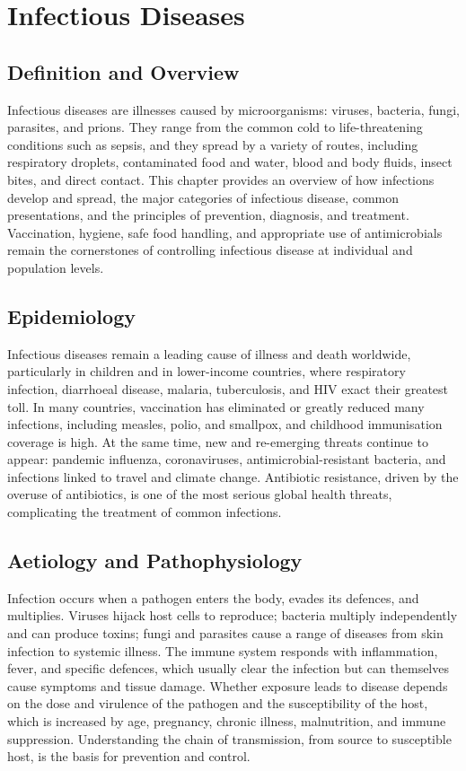 \chapter{Infectious Diseases}

\section*{Definition and Overview}
Infectious diseases are illnesses caused by microorganisms: viruses, bacteria, fungi, parasites, and prions. They range from the common cold to life-threatening conditions such as sepsis, and they spread by a variety of routes, including respiratory droplets, contaminated food and water, blood and body fluids, insect bites, and direct contact. This chapter provides an overview of how infections develop and spread, the major categories of infectious disease, common presentations, and the principles of prevention, diagnosis, and treatment. Vaccination, hygiene, safe food handling, and appropriate use of antimicrobials remain the cornerstones of controlling infectious disease at individual and population levels.

\section*{Epidemiology}
Infectious diseases remain a leading cause of illness and death worldwide, particularly in children and in lower-income countries, where respiratory infection, diarrhoeal disease, malaria, tuberculosis, and HIV exact their greatest toll. In many countries, vaccination has eliminated or greatly reduced many infections, including measles, polio, and smallpox, and childhood immunisation coverage is high. At the same time, new and re-emerging threats continue to appear: pandemic influenza, coronaviruses, antimicrobial-resistant bacteria, and infections linked to travel and climate change. Antibiotic resistance, driven by the overuse of antibiotics, is one of the most serious global health threats, complicating the treatment of common infections.

\section*{Aetiology and Pathophysiology}
Infection occurs when a pathogen enters the body, evades its defences, and multiplies. Viruses hijack host cells to reproduce; bacteria multiply independently and can produce toxins; fungi and parasites cause a range of diseases from skin infection to systemic illness. The immune system responds with inflammation, fever, and specific defences, which usually clear the infection but can themselves cause symptoms and tissue damage. Whether exposure leads to disease depends on the dose and virulence of the pathogen and the susceptibility of the host, which is increased by age, pregnancy, chronic illness, malnutrition, and immune suppression. Understanding the chain of transmission, from source to susceptible host, is the basis for prevention and control.

